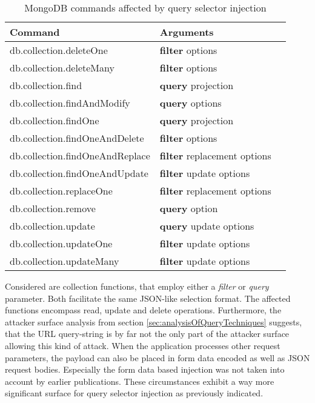 \begin{table}[h]
 \sffamily
 \centering
 \begin{tabular}{lll}
  \textbf{Command} & \textbf{Arguments} \\ \hline
  db.collection.deleteOne         & \textbf{filter} options \\
  db.collection.deleteMany        & \textbf{filter} options \\
  db.collection.find              & \textbf{query} projection \\
  db.collection.findAndModify     & \textbf{query} options \\
  db.collection.findOne           & \textbf{query} projection \\
  db.collection.findOneAndDelete  & \textbf{filter} options \\
  db.collection.findOneAndReplace & \textbf{filter} replacement options \\
  db.collection.findOneAndUpdate  & \textbf{filter} update options \\
  db.collection.replaceOne        & \textbf{filter} replacement options \\
  db.collection.remove            & \textbf{query} option \\
  db.collection.update            & \textbf{query} update options \\
  db.collection.updateOne         & \textbf{filter} update options \\
  db.collection.updateMany        & \textbf{filter} update options \\
  \bottomrule 
 \end{tabular}
 \caption{MongoDB commands affected by query selector injection}
 \label{tab:mongo_commands_affected}
\end{table}

Considered are collection functions, that employ either a \emph{filter} or \emph{query} parameter. Both facilitate the same JSON-like selection format. The affected functions encompass read, update and delete operations. Furthermore, the attacker surface analysis from section \ref{sec:analysisOfQueryTechniques} suggests, that the URL query-string is by far not the only part of the attacker surface allowing this kind of attack. When the application processes other request parameters, the payload can also be placed in form data encoded as well as JSON request bodies. Especially the form data based injection was not taken into account by earlier publications. These circumstances exhibit a way more significant surface for query selector injection as previously indicated. \\

